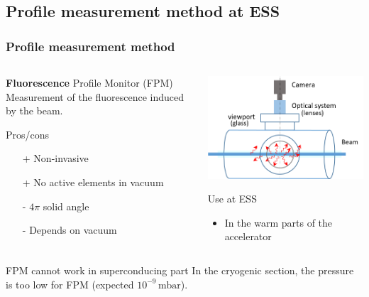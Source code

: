 \subsection{Profile measurement method at ESS}
\begin{frame}[t]
  \frametitle{Profile measurement method}
  \begin{columns}[T]
    \begin{column}{0.45\textwidth}
      \begin{block}{\textbf{Fluorescence} Profile Monitor (FPM)}
        Measurement of the fluorescence induced by the beam.
      \end{block}
      \begin{block}{Pros/cons}
        \begin{itemize}
          \item[+] Non-invasive
          \item[+] No active elements in vacuum
          \item[-] $4\pi$ solid angle
          \item[-] Depends on vacuum
        \end{itemize}
      \end{block}
    \end{column}
    \begin{column}{0.45\textwidth}
      \includegraphics[width=\textwidth]{02_ESS/fig/fig000_FPM2}

      \begin{block}{Use at ESS}
        \begin{itemize}
          \item In the warm parts of the accelerator
        \end{itemize}
      \end{block}
    \end{column}
  \end{columns}
  \begin{alertblock}{FPM cannot work in superconducing part}
    In the cryogenic section, the pressure is too low for FPM (expected $10^{-9}\,\mathrm{mbar}$).
  \end{alertblock}
\end{frame}


